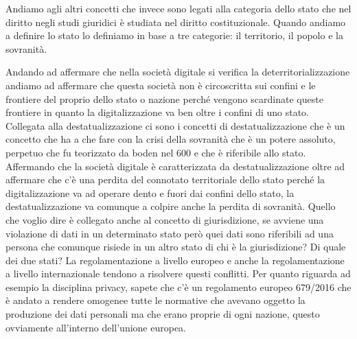 Andiamo agli altri concetti che invece sono legati alla categoria dello stato che nel diritto negli studi giuridici è studiata nel diritto costituzionale. Quando andiamo a definire lo stato lo definiamo in base a tre categorie:  il territorio, il popolo e la sovranità.

Andando ad affermare che nella società digitale si verifica la deterritorializzazione andiamo ad affermare che questa società non è circoscritta sui confini e le frontiere del proprio dello stato o nazione perché vengono scardinate queste frontiere in quanto la digitalizzazione va ben oltre i confini di uno stato.
Collegata alla destatualizzazione ci sono i concetti di destatualizzazione che è un concetto che ha a che fare con la crisi della sovranità che è un potere assoluto, perpetuo che fu teorizzato da boden nel 600 e che è riferibile allo stato. 
Affermando che la società digitale è caratterizzata da destatualizzazione oltre ad affermare che c'è una perdita del connotato territoriale dello stato perché la digitalizzazione va ad operare dento e fuori dai confini dello stato, la destatualizzazione  va comunque a colpire anche la perdita di sovranità.
Quello che voglio dire è collegato anche al concetto di giurisdizione, se avviene una violazione di dati in un determinato stato però quei dati sono riferibili ad una persona che comunque risiede in un altro stato di chi è la giurisdizione? Di quale dei due stati? 
La regolamentazione a livello europeo e anche la regolamentazione a livello internazionale tendono a risolvere questi conflitti. 
Per quanto riguarda ad esempio la disciplina privacy, sapete che c'è un regolamento europeo 679/2016 che è andato a rendere omogenee tutte le normative che avevano oggetto la produzione dei dati personali ma che erano proprie di ogni  nazione, questo ovviamente all'interno dell'unione europea.

